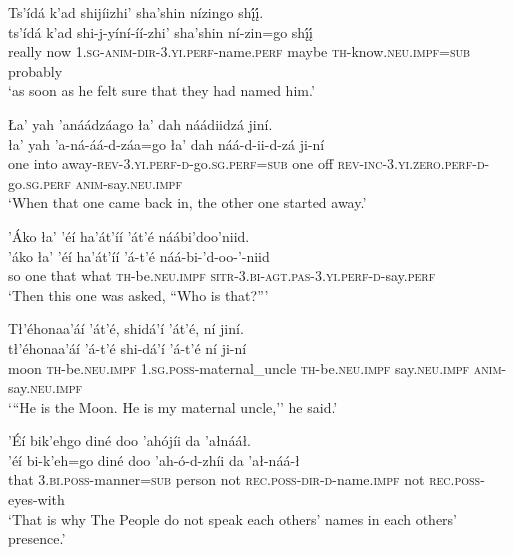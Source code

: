 \ea\label{ex:text4-3-5}
Ts’ídá k’ad shijíizhi’ sha’shin nízingo shį́į́.\\
\gll ts’ídá	k’ad	shi-j-yíní-íí-zhi’	sha’shin	ní-zin=go	shį́į́\\
     really	now	1.\textsc{sg}-\textsc{anim}-\textsc{dir}-3.\textsc{yi}.\textsc{perf}-name.\textsc{perf}	maybe	\textsc{th}-know.\textsc{neu}.\textsc{impf}=\textsc{sub}	probably\\
\glt `as soon as he felt sure that they had named him.'
\z

\ea\label{ex:text4-3-6}
Ła’ yah ’anáádzáago ła’ dah náádiidzá jiní.\\
\gll ła’	yah	’a-ná-áá-d-záa=go	ła’	dah	náá-d-ii-d-zá	ji-ní\\
     one	into	away-\textsc{rev}-3.\textsc{yi}.\textsc{perf}-\textsc{d}-go.\textsc{sg}.\textsc{perf}=\textsc{sub}	one	off	\textsc{rev}-\textsc{inc}-3.\textsc{yi}.\textsc{zero}.\textsc{perf}-\textsc{d}-go.\textsc{sg}.\textsc{perf}	\textsc{anim}-say.\textsc{neu}.\textsc{impf}\\
\glt `When that one came back in, the other one started away.'
\z

\ea\label{ex:text4-3-7}
’Áko ła’ ’éí ha’át’íí ’át’é náábi’doo’niid.\\
\gll ’áko	ła’	’éí	ha’át’íí	’á-t’é	náá-bi-’d-oo-’-niid\\
     so	one	that	what	\textsc{th}-be.\textsc{neu}.\textsc{impf}	\textsc{sitr}-3.\textsc{bi}-\textsc{agt}.\textsc{pas}-3.\textsc{yi}.\textsc{perf}-\textsc{d}-say.\textsc{perf}\\
\glt `Then this one was asked, ``Who is that?'''
\z

\newpage
\ea\label{ex:text4-3-8}
Tł’éhonaa’áí ’át’é, shidá’í ’át’é, ní jiní.\\
\gll tł’éhonaa’áí	’á-t’é	shi-dá’í	’á-t’é	ní	ji-ní\\
     moon	\textsc{th}-be.\textsc{neu}.\textsc{impf}	1.\textsc{sg}.\textsc{poss}-maternal\_uncle	\textsc{th}-be.\textsc{neu}.\textsc{impf}	say.\textsc{neu}.\textsc{impf}	\textsc{anim}-say.\textsc{neu}.\textsc{impf}\\
\glt `{``}He is the Moon. He is my maternal uncle,'' he said.'
\z

\ea\label{ex:text4-3-9}
’Éí bik’ehgo diné doo ’ahójíi da ’ałnááł.\\
\gll ’éí	bi-k’eh=go	diné	doo	’ah-ó-d-zhíi	da	’ał-náá-ł\\
     that	3.\textsc{bi}.\textsc{poss}-manner=\textsc{sub}	person	not	\textsc{rec}.\textsc{poss}-\textsc{dir}-\textsc{d}-name.\textsc{impf}	not	\textsc{rec}.\textsc{poss}-eyes-with\\
\glt `That is why The People do not speak each others' names in each others' presence.'
\z

